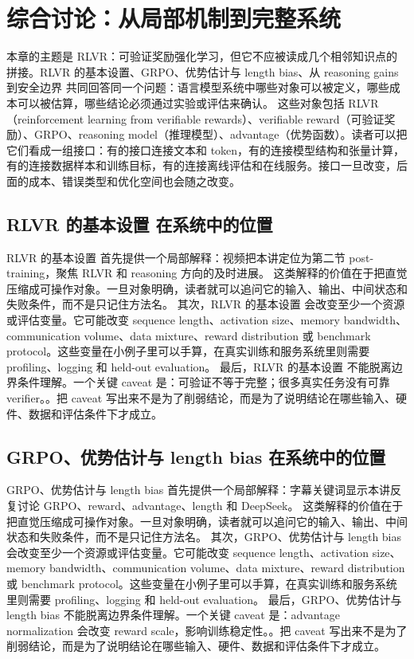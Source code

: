 \documentclass[a4paper]{article}
\begin{document}
\section{综合讨论：从局部机制到完整系统}
本章的主题是 RLVR：可验证奖励强化学习，但它不应被读成几个相邻知识点的拼接。RLVR 的基本设置、GRPO、优势估计与 length bias、从 reasoning gains 到安全边界 共同回答同一个问题：语言模型系统中哪些对象可以被定义，哪些成本可以被估算，哪些结论必须通过实验或评估来确认。
这些对象包括 RLVR（reinforcement learning from verifiable rewards）、verifiable reward（可验证奖励）、GRPO、reasoning model（推理模型）、advantage（优势函数）。读者可以把它们看成一组接口：有的接口连接文本和 token，有的连接模型结构和张量计算，有的连接数据样本和训练目标，有的连接离线评估和在线服务。接口一旦改变，后面的成本、错误类型和优化空间也会随之改变。
\subsection{RLVR 的基本设置 在系统中的位置}
RLVR 的基本设置 首先提供一个局部解释：视频把本讲定位为第二节 post-training，聚焦 RLVR 和 reasoning 方向的及时进展。 这类解释的价值在于把直觉压缩成可操作对象。一旦对象明确，读者就可以追问它的输入、输出、中间状态和失败条件，而不是只记住方法名。
其次，RLVR 的基本设置 会改变至少一个资源或评估变量。它可能改变 sequence length、activation size、memory bandwidth、communication volume、data mixture、reward distribution 或 benchmark protocol。这些变量在小例子里可以手算，在真实训练和服务系统里则需要 profiling、logging 和 held-out evaluation。
最后，RLVR 的基本设置 不能脱离边界条件理解。一个关键 caveat 是：可验证不等于完整；很多真实任务没有可靠 verifier。。把 caveat 写出来不是为了削弱结论，而是为了说明结论在哪些输入、硬件、数据和评估条件下才成立。
\subsection{GRPO、优势估计与 length bias 在系统中的位置}
GRPO、优势估计与 length bias 首先提供一个局部解释：字幕关键词显示本讲反复讨论 GRPO、reward、advantage、length 和 DeepSeek。 这类解释的价值在于把直觉压缩成可操作对象。一旦对象明确，读者就可以追问它的输入、输出、中间状态和失败条件，而不是只记住方法名。
其次，GRPO、优势估计与 length bias 会改变至少一个资源或评估变量。它可能改变 sequence length、activation size、memory bandwidth、communication volume、data mixture、reward distribution 或 benchmark protocol。这些变量在小例子里可以手算，在真实训练和服务系统里则需要 profiling、logging 和 held-out evaluation。
最后，GRPO、优势估计与 length bias 不能脱离边界条件理解。一个关键 caveat 是：advantage normalization 会改变 reward scale，影响训练稳定性。。把 caveat 写出来不是为了削弱结论，而是为了说明结论在哪些输入、硬件、数据和评估条件下才成立。
\end{document}
